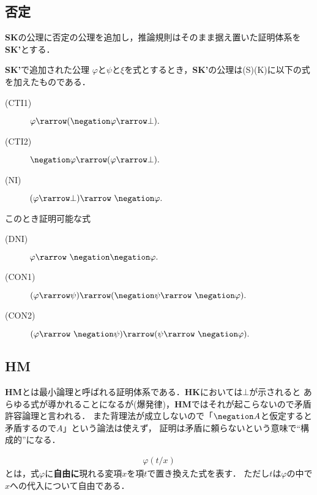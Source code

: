 \subsection{否定}
	{\bf SK}の公理に否定の公理を追加し，推論規則はそのまま据え置いた証明体系を{\bf SK'}とする．
	
	\begin{itembox}[l]{{\bf SK'}で追加された公理}
		$\varphi$と$\psi$と$\xi$を式とするとき，{\bf SK'}の公理は(S)(K)に以下の式を加えたものである．
		\begin{description}
			\item[(CTI1)] $\varphi \rarrow (\negation \varphi \rarrow \bot).$
			
			\item[(CTI2)] $\negation \varphi \rarrow (\varphi \rarrow \bot).$
			
			\item[(NI)] $(\varphi \rarrow \bot) \rarrow\ \negation \varphi.$
		\end{description}
	\end{itembox}
	
	このとき証明可能な式
	\begin{description}
		\item[(DNI)] $\varphi \rarrow\ \negation \negation \varphi.$
		\item[(CON1)] $(\varphi \rarrow \psi) \rarrow (\negation \psi \rarrow\ \negation \varphi).$
		\item[(CON2)] $(\varphi \rarrow\ \negation \psi) \rarrow (\psi \rarrow\ \negation \varphi).$
	\end{description}
	
\subsection{{\bf HM}}
	{\bf HM}とは最小論理と呼ばれる証明体系である．{\bf HK}においては$\bot$が示されると
	あらゆる式が導かれることになるが(爆発律)，{\bf HM}ではそれが起こらないので矛盾許容論理と言われる．
	また背理法が成立しないので「$\negation A$と仮定すると矛盾するので$A$」という論法は使えず，
	証明は矛盾に頼らないという意味で``構成的''になる．
	
	\begin{align}
		\varphi(t/x)
	\end{align}
	とは，式$\varphi$に{\bf 自由に}現れる変項$x$を項$t$で置き換えた式を表す．
	ただし$t$は$\varphi$の中で$x$への代入について自由である．
	
